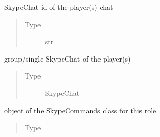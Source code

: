 \documentclass[letterpaper,10pt,english]{sphinxmanual}
\begin{document}
\begin{fulllineitems}
\begin{fulllineitems}
\begin{quote}
\begin{description}
\end{description}\end{quote}

\end{fulllineitems}



\begin{fulllineitems}
SkypeChat id of the player(s) chat
\begin{quote}\begin{description}
\item[{Type}] \leavevmode
str

\end{description}\end{quote}

\end{fulllineitems}



\begin{fulllineitems}
group/single SkypeChat of the player(s)
\begin{quote}\begin{description}
\item[{Type}] \leavevmode
SkypeChat

\end{description}\end{quote}

\end{fulllineitems}



\begin{fulllineitems}
object of the SkypeCommands class for this role
\begin{quote}\begin{description}
\item[{Type}] \leavevmode
{\hyperref[\detokenize{chatwolf:chatwolf.skypecommands.SkypeCommands}]{}}

\end{description}\end{quote}

\end{fulllineitems}



\begin{fulllineitems}
\end{fulllineitems}




\end{fulllineitems}
\end{document}
